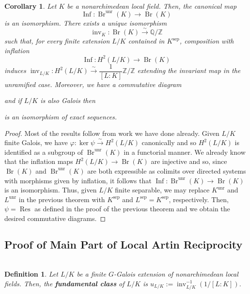 \documentclass[11pt]{article}
\newcommand{\Q}{\mathbb{Q}}
\newcommand{\Z}{\mathbb{Z}}
\newcommand{\df}{\dfrac}
\newcommand{\xto}[1]{\xrightarrow{#1}}
\DeclareMathOperator{\Br}{Br} %
\DeclareMathOperator{\Inf}{Inf} %
\DeclareMathOperator{\inv}{inv} %
\DeclareMathOperator{\Res}{Res} %
\DeclareMathOperator{\sep}{sep} %
\DeclareMathOperator{\unr}{unr} %
\renewcommand{\phi}{\varphi}
\newtheorem*{corollary*}{\\Corollary}
\newtheorem*{definition*}{\\Definition}
\begin{document}
\begin{corollary*}
Let $K$ be a nonarchimedean local field. Then, the canonical map 
$$\Inf: \Br^{\unr}(K)\to\Br(K)$$ 
is an isomorphism. There exists a unique isomorphism 
$$\inv_K: \Br(K)\xto{\sim}\Q/\Z$$
such that, for every finite extension $L/K$ contained in $K^{\sep}$, composition with inflation 
$$\Inf: H^2(L/K)\to\Br(K)$$ 
induces $\inv_{L/K}: H^2(L/K)\xto{\sim}\df{1}{[L:K]}\Z/\Z$ extending the invariant map in the unramified case. Moreover, we have a commutative diagram 
\begin{center}
\end{center}
and if $L/K$ is also Galois then 
\begin{center}
\end{center}
is an isomorphism of exact sequences.
\end{corollary*}
\begin{proof}
Most of the results follow from work we have done already. Given $L/K$ finite Galois, we have $\phi: \ker\psi\xto{\sim}H^2(L/K)$ canonically and so $H^2(L/K)$ is identified as a subgroup of $\Br^{\unr}(K)$ in a functorial manner. We already know that the inflation maps $H^2(L/K)\to\Br(K)$ are injective and so, since $\Br(K)$ and $\Br^{\unr}(K)$ are both expressible as colimits over directed systems with morphisms given by inflation, it follows that $\Inf: \Br^{\unr}(K)\to\Br(K)$ is an isomorphism. Thus, given $L/K$ finite separable, we may replace $K^{\unr}$ and $L^{\unr}$ in the previous theorem with $K^{\sep}$ and $L^{\sep}=K^{\sep}$, respectively. Then, $\psi=\Res$ as defined in the proof of the previous theorem and we obtain the desired commutative diagrams.
\end{proof}

\subsection{Proof of Main Part of Local Artin Reciprocity}
\begin{definition*}
Let $L/K$ be a finite $G$-Galois extension of nonarchimedean local fields. Then, the \textbf{fundamental class} of $L/K$ is $u_{L/K}:=\inv_{L/K}^{-1}(1/[L:K])$.
\end{definition*}
\end{document}
